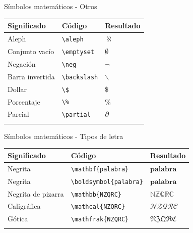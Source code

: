 \documentclass[
  ignorenonframetext,
]{beamer}
\begin{document}
\begin{frame}[fragile]{Símbolos matemáticos - Otros}
\label{suxedmbolos-matemuxe1ticos---otros-1}
\begin{longtable}[]{@{}lll@{}}
\toprule\noalign{}
Significado & Código & Resultado \\
\midrule\noalign{}
\endhead
Aleph & \texttt{\textbackslash{}aleph} & \(\aleph\) \\
Conjunto vacío & \texttt{\textbackslash{}emptyset} & \(\emptyset\) \\
Negación & \texttt{\textbackslash{}neg} & \(\neg\) \\
Barra invertida & \texttt{\textbackslash{}backslash} & \(\backslash\) \\
Dollar & \texttt{\textbackslash{}\$} & \(\$\) \\
Porcentaje & \texttt{\textbackslash{}\%} & \(\%\) \\
Parcial & \texttt{\textbackslash{}partial} & \(\partial\) \\
\bottomrule\noalign{}
\end{longtable}
\end{frame}

\begin{frame}[fragile]{Símbolos matemáticos - Tipos de letra}
\label{suxedmbolos-matemuxe1ticos---tipos-de-letra}
\begin{longtable}[]{@{}lll@{}}
\toprule\noalign{}
Significado & Código & Resultado \\
\midrule\noalign{}
\endhead
Negrita & \texttt{\textbackslash{}mathbf\{palabra\}} &
\(\mathbf{palabra}\) \\
Negrita & \texttt{\textbackslash{}boldsymbol\{palabra\}} &
\(\boldsymbol{palabra}\) \\
Negrita de pizarra & \texttt{\textbackslash{}mathbb\{NZQRC\}} &
\(\mathbb{NZQRC}\) \\
Caligráfica & \texttt{\textbackslash{}mathcal\{NZQRC\}} &
\(\mathcal{NZQRC}\) \\
Gótica & \texttt{\textbackslash{}mathfrak\{NZQRC\}} &
\(\mathfrak{NZQRC}\) \\
\bottomrule\noalign{}
\end{longtable}
\end{frame}
\end{document}
